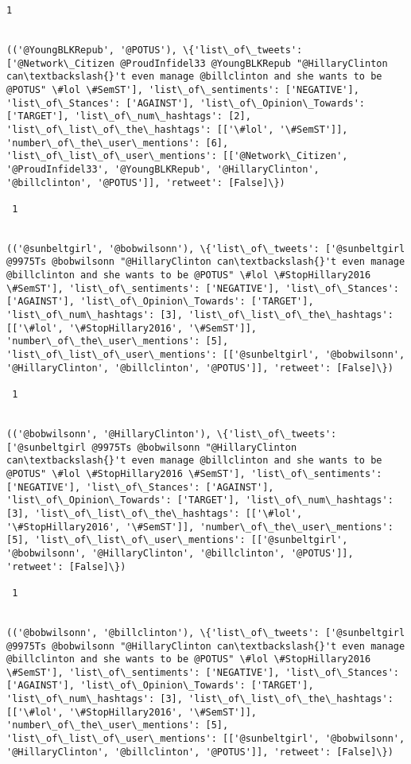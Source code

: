 \documentclass[11pt]{article}
\begin{document}
\begin{Verbatim}[commandchars=\\\{\}]
 1
 

(('@YoungBLKRepub', '@POTUS'), \{'list\_of\_tweets': ['@Network\_Citizen @ProudInfidel33 @YoungBLKRepub "@HillaryClinton can\textbackslash{}'t even manage @billclinton and she wants to be @POTUS" \#lol \#SemST'], 'list\_of\_sentiments': ['NEGATIVE'], 'list\_of\_Stances': ['AGAINST'], 'list\_of\_Opinion\_Towards': ['TARGET'], 'list\_of\_num\_hashtags': [2], 'list\_of\_list\_of\_the\_hashtags': [['\#lol', '\#SemST']], 'number\_of\_the\_user\_mentions': [6], 'list\_of\_list\_of\_user\_mentions': [['@Network\_Citizen', '@ProudInfidel33', '@YoungBLKRepub', '@HillaryClinton', '@billclinton', '@POTUS']], 'retweet': [False]\})

 1
 

(('@sunbeltgirl', '@bobwilsonn'), \{'list\_of\_tweets': ['@sunbeltgirl @9975Ts @bobwilsonn "@HillaryClinton can\textbackslash{}'t even manage @billclinton and she wants to be @POTUS" \#lol \#StopHillary2016 \#SemST'], 'list\_of\_sentiments': ['NEGATIVE'], 'list\_of\_Stances': ['AGAINST'], 'list\_of\_Opinion\_Towards': ['TARGET'], 'list\_of\_num\_hashtags': [3], 'list\_of\_list\_of\_the\_hashtags': [['\#lol', '\#StopHillary2016', '\#SemST']], 'number\_of\_the\_user\_mentions': [5], 'list\_of\_list\_of\_user\_mentions': [['@sunbeltgirl', '@bobwilsonn', '@HillaryClinton', '@billclinton', '@POTUS']], 'retweet': [False]\})

 1
 

(('@bobwilsonn', '@HillaryClinton'), \{'list\_of\_tweets': ['@sunbeltgirl @9975Ts @bobwilsonn "@HillaryClinton can\textbackslash{}'t even manage @billclinton and she wants to be @POTUS" \#lol \#StopHillary2016 \#SemST'], 'list\_of\_sentiments': ['NEGATIVE'], 'list\_of\_Stances': ['AGAINST'], 'list\_of\_Opinion\_Towards': ['TARGET'], 'list\_of\_num\_hashtags': [3], 'list\_of\_list\_of\_the\_hashtags': [['\#lol', '\#StopHillary2016', '\#SemST']], 'number\_of\_the\_user\_mentions': [5], 'list\_of\_list\_of\_user\_mentions': [['@sunbeltgirl', '@bobwilsonn', '@HillaryClinton', '@billclinton', '@POTUS']], 'retweet': [False]\})

 1
 

(('@bobwilsonn', '@billclinton'), \{'list\_of\_tweets': ['@sunbeltgirl @9975Ts @bobwilsonn "@HillaryClinton can\textbackslash{}'t even manage @billclinton and she wants to be @POTUS" \#lol \#StopHillary2016 \#SemST'], 'list\_of\_sentiments': ['NEGATIVE'], 'list\_of\_Stances': ['AGAINST'], 'list\_of\_Opinion\_Towards': ['TARGET'], 'list\_of\_num\_hashtags': [3], 'list\_of\_list\_of\_the\_hashtags': [['\#lol', '\#StopHillary2016', '\#SemST']], 'number\_of\_the\_user\_mentions': [5], 'list\_of\_list\_of\_user\_mentions': [['@sunbeltgirl', '@bobwilsonn', '@HillaryClinton', '@billclinton', '@POTUS']], 'retweet': [False]\})


\end{Verbatim}
\end{document}
